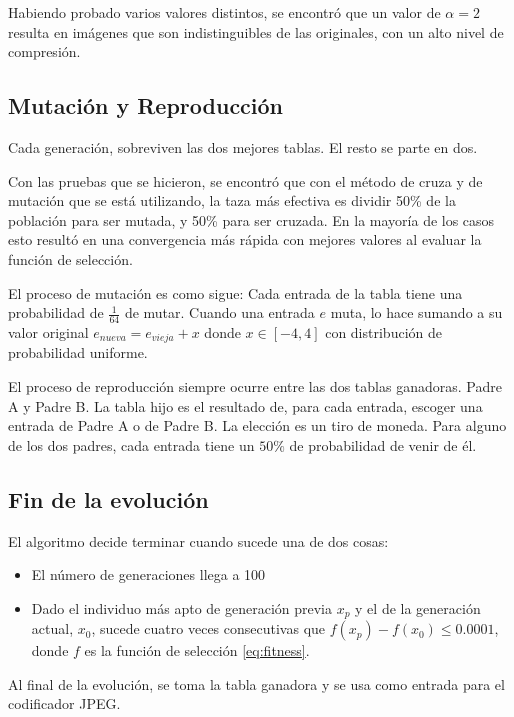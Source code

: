 Habiendo probado varios valores distintos, se encontró que un valor de $\alpha
= 2$ resulta en imágenes que son indistinguibles de las originales, con un alto
nivel de compresión.


\subsection {Mutación y Reproducción}

Cada generación, sobreviven las dos mejores tablas. El resto se parte en dos.

Con las pruebas que se hicieron, se encontró que con el método de cruza y de
mutación que se está utilizando, la taza más efectiva es dividir 50\% de la
población para ser mutada, y 50\% para ser cruzada. En la mayoría de los casos
esto resultó en una convergencia más rápida con mejores valores al evaluar la
función de selección.

El proceso de mutación es como sigue: Cada entrada de la tabla tiene una
probabilidad de $\frac{1}{64}$ de mutar. Cuando una entrada $e$ muta, lo hace
sumando a su valor original $e_{nueva} = e_{vieja} + x $ donde $x \in [-4, 4]$
con distribución de probabilidad uniforme.

El proceso de reproducción siempre ocurre entre las dos tablas ganadoras. Padre
A y Padre B.  La tabla hijo es el resultado de, para cada entrada, escoger una
entrada de Padre A o de Padre B. La elección es un tiro de moneda. Para alguno
de los dos padres, cada entrada tiene un $50\%$ de probabilidad de venir de él.

\subsection {Fin de la evolución}

El algoritmo decide terminar cuando sucede una de dos cosas:

\begin{itemize}
\item El número de generaciones llega a 100
\item Dado el individuo más apto de generación previa $x_p$ y el de la generación actual, $x_0$, sucede cuatro veces consecutivas que $f(x_p) - f(x_0) \leq 0.0001$, donde $f$ es la función de selección \ref{eq:fitness}.
\end{itemize}

Al final de la evolución, se toma la tabla ganadora y se usa como entrada para
el codificador \gls{JPEG}.

